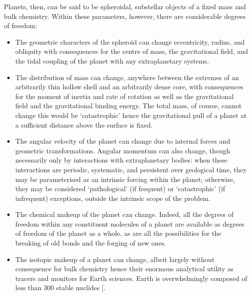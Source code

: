\documentclass[letterpaper,10pt,english]{jupyterBook}
\begin{document}
\sphinxAtStartPar
Planets, then, can be said to be spheroidal, sub\sphinxhyphen{}stellar objects of a fixed mass and bulk chemistry. Within these parameters, however, there are considerable degrees of freedom:
\begin{itemize}
\item {} 
\sphinxAtStartPar
The geometric characters of the spheroid can change \sphinxhyphen{} eccentricity, radius, and obliquity \sphinxhyphen{} with consequences for the centre of mass, the gravitational field, and the tidal coupling of the planet with any extra\sphinxhyphen{}planetary systems.

\item {} 
\sphinxAtStartPar
The distribution of mass can change, anywhere between the extremes of an arbitrarily thin hollow shell and an arbitrarily dense core, with consequences for the moment of inertia and rate of rotation as well as the gravitational field and the gravitational binding energy. The total mass, of course, cannot change \sphinxhyphen{} this would be ‘catastrophic’ \sphinxhyphen{} hence the gravitational pull of a planet at a sufficient distance above the surface is fixed.

\item {} 
\sphinxAtStartPar
The angular velocity of the planet can change due to internal forces and geometric transformations. Angular momentum can also change, though necessarily only by interactions with extra\sphinxhyphen{}planetary bodies: when these interactions are periodic, systematic, and persistent over geological time, they may be parameterised as an intrinsic forcing within the planet; otherwise, they may be considered ‘pathological’ (if frequent) or ‘catastrophic’ (if infrequent) exceptions, outside the intrinsic scope of the problem.

\item {} 
\sphinxAtStartPar
The chemical makeup of the planet can change. Indeed, all the degrees of freedom within any constituent molecules of a planet are available as degrees of freedom of the planet as a whole, as are all the possibilities for the breaking of old bonds and the forging of new ones.

\item {} 
\sphinxAtStartPar
The isotopic makeup of a planet can change, albeit largely without consequence for bulk chemistry \sphinxhyphen{} hence their enormous analytical utility as tracers and monitors for Earth sciences. Earth is overwhelmingly composed of less than 300 stable nuclides {[}\sphinxcite{references:id111}{]}.


\end{itemize}
\end{document}
